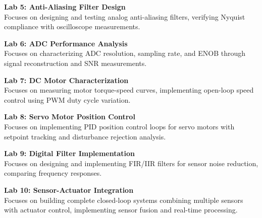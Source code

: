 \vspace{0.2cm}

\noindent\textbf{Lab 5: Anti-Aliasing Filter Design} \\
Focuses on designing and testing analog anti-aliasing filters, verifying Nyquist compliance with oscilloscope measurements.

\vspace{0.2cm}

\noindent\textbf{Lab 6: ADC Performance Analysis} \\
Focuses on characterizing ADC resolution, sampling rate, and ENOB through signal reconstruction and SNR measurements.

\vspace{0.2cm}

\noindent\textbf{Lab 7: DC Motor Characterization} \\
Focuses on measuring motor torque-speed curves, implementing open-loop speed control using PWM duty cycle variation.

\vspace{0.2cm}

\noindent\textbf{Lab 8: Servo Motor Position Control} \\
Focuses on implementing PID position control loops for servo motors with setpoint tracking and disturbance rejection analysis.

\vspace{0.2cm}

\noindent\textbf{Lab 9: Digital Filter Implementation} \\
Focuses on designing and implementing FIR/IIR filters for sensor noise reduction, comparing frequency responses.

\vspace{0.2cm}

\noindent\textbf{Lab 10: Sensor-Actuator Integration} \\
Focuses on building complete closed-loop systems combining multiple sensors with actuator control, implementing sensor fusion and real-time processing.

\vspace{0.2cm}

\newpage
{}
